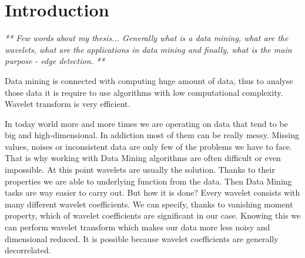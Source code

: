 \chapter*{Introduction}

\textit{ ** Few words about my thesis...
Generally what is a data mining, what are the wavelets, what are the applications in data mining and finally, what is the main purpose - edge detection. **}

Data mining is connected with computing huge amount of data, thus to analyse those data it is require to use algorithms with low computational complexity. Wavelet transform is very efficient.


%	

In today world more and more times we are operating on data that tend to be big and high-dimensional.
In addiction most of them can be really messy. Missing values, noises or inconsistent data are only few of the problems we have to face. That is why working with Data Mining algorithms are often difficult or even impossible. 
At this point wavelets are usually the solution. Thanks to their properties we are able to underlying function from the data.
Then Data Mining tasks are way easier to carry out. 
But how it is done? Every wavelet consists with many different wavelet coefficients.
We can specify, thanks to vanishing moment property, which of wavelet coefficients are significant in our case.
Knowing this we can perform wavelet transform which makes our data more less noisy and dimensional reduced.
It is possible because wavelet coefficients are generally decorrelated.

%
%
%
%
%
%
